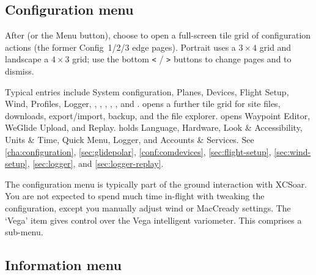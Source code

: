 \subsection*{Configuration menu}

After  (or the Menu button), choose  to open a
full-screen tile grid of configuration actions (the former Config~1/2/3 edge
pages).  Portrait uses a $3{\times}4$ grid and landscape a $4{\times}3$ grid;
use the bottom \texttt{<} / \texttt{>} buttons to change pages and
 to dismiss.

Typical entries include System configuration, Planes, Devices, Flight Setup,
Wind, Profiles, Logger, , ,
, , , and
.
 opens a further tile grid for site files, downloads,
export/import, backup, and the file explorer.   opens Waypoint
Editor, WeGlide Upload, and Replay.   holds Language,
Hardware, Look \& Accessibility, Units \& Time, Quick Menu, Logger, and
Accounts \& Services.
See \ref{cha:configuration}, \ref{sec:glidepolar}, \ref{conf:comdevices},
\ref{sec:flight-setup}, \ref{sec:wind-setup}, \ref{sec:logger}, and
\ref{sec:logger-replay}.

The configuration menu is typically part of the ground interaction with
XCSoar. You are not expected to spend much time in-flight with tweaking
the configuration, except you manually adjust wind or MacCready settings.
The `Vega' item gives control over the  Vega intelligent variometer. This
comprises a sub-menu.


\subsection*{Information menu}
\noindent{}

